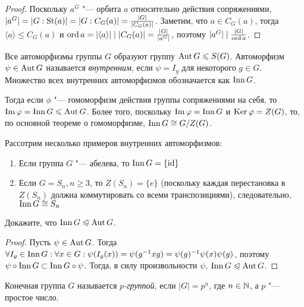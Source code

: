 \begin{proof}
	Поскольку $a^G$ "--- орбита $a$ относительно действия сопряжениями, $|a^G| \hm= |G : \St(a)| = |G : C_G(a)| = \frac{|G|}{|C_G(a)|}$. Заметим, что $a \in C_G(a)$, тогда $\langle a \rangle \le C_G(a)$ и $\ord{a} \hm= |\langle a \rangle| \mid |C_G(a)| = \frac{|G|}{|a^G|}$, поэтому $|a^G| \mid \frac{|G|}{\operatorname{ord} a}$.
\end{proof}

\begin{definition}
	Все автоморфизмы группы $G$ образуют группу $\operatorname{Aut} G \leqslant S(G)$. Автоморфизм $\psi \in \operatorname{Aut} G$ называется \textit{внутренним}, если $\psi = I_g$ для некоторого $g \in G$. Множество всех внутренних автоморфизмов обозначается как $\operatorname{Inn} G$.
\end{definition}

\begin{note}
	Тогда если $\phi$ "--- гомоморфизм действия группы сопряжениями на себя, то $\im\phi \hm= \Inn G \le \Aut G$. Более того, поскольку $\operatorname{Im}\varphi = \operatorname{Inn} G$ и $\operatorname{Ker}\varphi = Z(G)$, то, по основной теореме о гомоморфизме, $\operatorname{Inn} G \cong G / Z(G)$.
\end{note}

\begin{example}
	Рассотрим несколько примеров внутренних автоморфизмов:
	\begin{enumerate}
		\item Если группа $G$ "--- абелева, то $\operatorname{Inn}{G} = \{\operatorname{id}\}$
		\item Если $G = S_n, n \ge 3$, то $Z(S_n) = \{e\}$ (поскольку каждая перестановка в $Z(S_n)$ должна коммутировать со всеми транспозициями), следовательно, $\operatorname{Inn}{G} \cong S_n$
	\end{enumerate}
\end{example}

\begin{exercise}
	Докажите, что $\operatorname{Inn}{G} \trianglelefteqslant \operatorname{Aut}{G}$.
\end{exercise}

\begin{proof}
	Пусть $\psi \in \operatorname{Aut}{G}$. Тогда $\forall I_g \in \Inn{G}: \forall x \hm\in G: \psi(I_g(x)) = \psi(g^{-1}xg) \hm= \psi(g)^{-1}\psi(x)\psi(g)$, поэтому $\psi\circ\operatorname{Inn}{G} \subset \operatorname{Inn}{G}\circ\psi$. Тогда, в силу произвольности $\psi$, $\Inn{G} \hm\normal \Aut{G}$.
\end{proof}

\begin{definition}
	Конечная группа $G$ называется \textit{$p$-группой}, если $|G| = p^n$, где $n \in \mathbb{N}$, а $p$ "--- простое число.
\end{definition}

